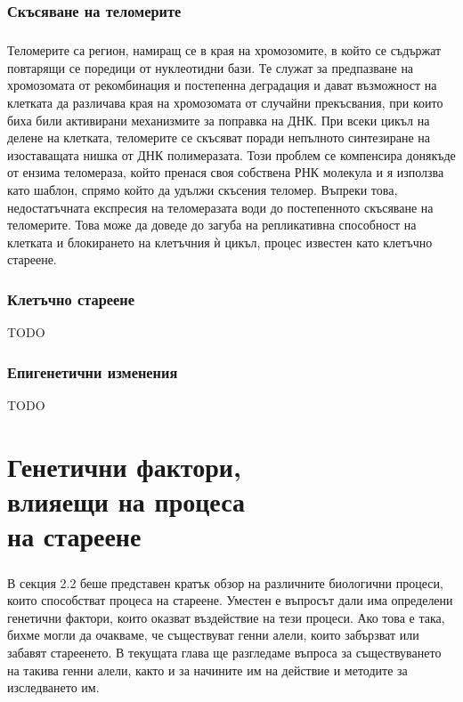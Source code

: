 \documentclass[pdftex,cyrillic,14pt,a4page,twoside]{extreport}
\begin{document}
\subsection{Скъсяване на теломерите}
\paragraph{}
Теломерите са регион, намиращ се в края на хромозомите, в който се съдържат повтарящи се поредици от нуклеотидни бази. Те служат за предпазване на хромозомата от рекомбинация и постепенна деградация и дават възможност на клетката да различава края на хромозомата от случайни прекъсвания, при които биха били активирани механизмите за поправка на ДНК\cite{griffith1999}. При всеки цикъл на делене на клетката, теломерите се скъсяват поради непълното синтезиране на изоставащата нишка от ДНК полимеразата\cite{koliada2015}. Този проблем се компенсира донякъде от ензима теломераза, който пренася своя собствена РНК молекула и я използва като шаблон, спрямо който да удължи скъсения теломер. Въпреки това, недостатъчната експресия на теломеразата води до постепенното скъсяване на теломерите. Това може да доведе до загуба на репликативна способност на клетката и блокирането на клетъчния ѝ цикъл, процес известен като клетъчно стареене\cite{muraki2012}.

\subsection{Клетъчно стареене}
TODO

\subsection{Епигенетични изменения}
TODO

\chapter{Генетични фактори,\\ влияещи на процеса\\ на стареене}
\paragraph{}
В секция 2.2 беше представен кратък обзор на различните биологични процеси, които способстват процеса на стареене. Уместен е въпросът дали има определени генетични фактори, които оказват въздействие на тези процеси. Ако това е така, бихме могли да очакваме, че съществуват генни алели, които забързват или забавят стареенето. В текущата глава ще разгледаме въпроса за съществуването на такива генни алели, както и за начините им на действие и методите за изследването им. 
\end{document}
